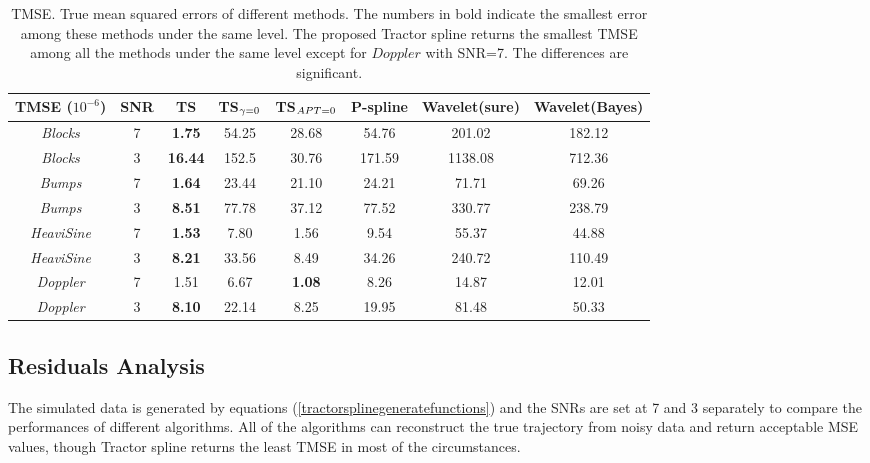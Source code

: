 \begin{table}
	\centering
	\caption{TMSE. True mean squared errors of different methods. The numbers in bold indicate the smallest error among these methods under the same level. The proposed Tractor spline returns the smallest TMSE among all the methods under the same level except for $\textit{Doppler}$ with SNR=7. The differences are significant. }\label{tmse3200}
	\setlength\tabcolsep{1.5pt}
	\begin{tabular}{|c|c| c| c| c|c|c|c|}
\hline	TMSE ($10^{-6}$)  & SNR & TS & TS$_{\footnotesize\gamma=0}$ & TS$_{\footnotesize APT=0}$  & P-spline & Wavelet(sure) & Wavelet(Bayes)\\ \hline
		\textit{Blocks}    & 7   & \textbf{1.75} & 54.25 &  28.68   & 54.76   & 201.02   & 182.12   \\ \hline
		\textit{Blocks}    & 3   & \textbf{16.44} & 152.5 & 30.76  & 171.59   & 1138.08  & 712.36  \\ \hline
		\textit{Bumps}     & 7  & \textbf{1.64} & 23.44  & 21.10     & 24.21 & 71.71 & 69.26 \\ \hline
		\textit{Bumps}     & 3  & \textbf{8.51} & 77.78  &37.12     & 77.52 & 330.77 & 238.79 \\ \hline
		\textit{HeaviSine} & 7 & \textbf{1.53}& 7.80  & 1.56     & 9.54   & 55.37  &44.88  \\ \hline
		\textit{HeaviSine} & 3 & \textbf{8.21}& 33.56  & 8.49 & 34.26 & 240.72& 110.49\\ \hline
		\textit{Doppler}   & 7   & 1.51& 6.67  & \textbf{1.08}   &  8.26   & 14.87  & 12.01  \\ \hline
		\textit{Doppler}   & 3   & \textbf{8.10} & 22.14  & 8.25   & 19.95    &81.48  &50.33   \\ \hline
	\end{tabular}	
\end{table}


\subsection{Residuals Analysis}

The simulated data is generated by equations (\ref{tractorsplinegeneratefunctions}) and the SNRs are set at 7 and 3 separately to compare the performances of different algorithms. All of the algorithms can reconstruct the true trajectory from noisy data and return acceptable MSE values, though Tractor spline returns the least TMSE in most of the circumstances. 

